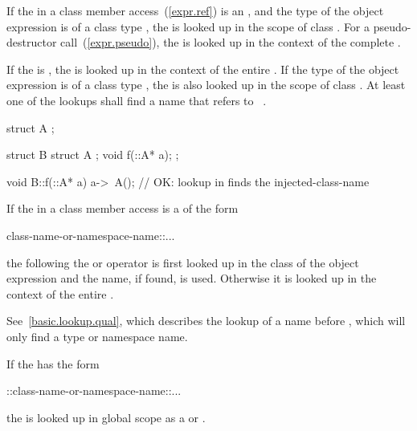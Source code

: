 \pnum
If the  in a class member
access~(\ref{expr.ref}) is an , and the type of
the object expression is of a class type , the
 is looked up in the scope of class .
For a pseudo-destructor call~(\ref{expr.pseudo}),
the  is looked up in the context of the complete
.

\pnum
If the  is \tcode{\~}, the
 is looked up in the context of the entire
. If the type  of the object
expression is of a class type , the  is
also looked up in the scope of class . At least one of the
lookups shall find a name that refers to \cv{}~. \begin{example}

\begin{codeblock}
struct A { };

struct B {
  struct A { };
  void f(::A* a);
};

void B::f(::A* a) {
  a->~A();                      // OK: lookup in  finds the injected-class-name
}
\end{codeblock}\end{example}

\pnum
If the  in a class member access is a
 of the form
\begin{codeblock}
class-name-or-namespace-name::...
\end{codeblock}
the  following the  or
\tcode{->} operator is
first looked up in the class of the object expression and the name, if found,
is used. Otherwise it is looked up in the context of the entire
. \begin{note} See~\ref{basic.lookup.qual}, which
describes the lookup of a name before \tcode{::}, which will only find a type
or namespace name. \end{note}

\pnum
If the  has the form
\begin{codeblock}
::class-name-or-namespace-name::...
\end{codeblock}
the  is looked up in global scope
as a  or .

